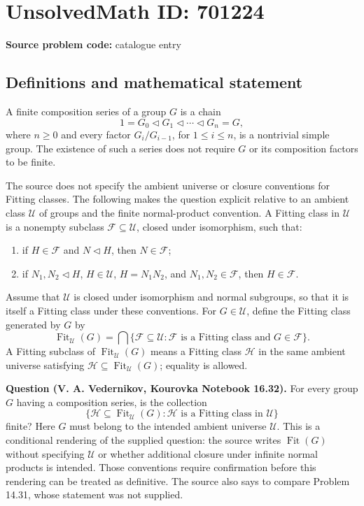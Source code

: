 \documentclass[11pt]{article}
\begin{document}
\section*{UnsolvedMath ID: 701224}
\textbf{Source problem code:} catalogue entry
\subsection{Definitions and mathematical statement}
A finite composition series of a group \(G\) is a chain
\[
1=G_0\triangleleft G_1\triangleleft\cdots\triangleleft G_n=G,
\]
where \(n\geq 0\) and every factor \(G_i/G_{i-1}\), for \(1\leq i\leq n\), is a nontrivial simple group. The existence of such a series does not require \(G\) or its composition factors to be finite.

The source does not specify the ambient universe or closure conventions for Fitting classes. The following makes the question explicit relative to an ambient class \(\mathcal U\) of groups and the finite normal-product convention. A Fitting class in \(\mathcal U\) is a nonempty subclass \(\mathcal F\subseteq\mathcal U\), closed under isomorphism, such that:
\begin{enumerate}
\item if \(H\in\mathcal F\) and \(N\triangleleft H\), then \(N\in\mathcal F\);
\item if \(N_1,N_2\triangleleft H\), \(H\in\mathcal U\), \(H=N_1N_2\), and \(N_1,N_2\in\mathcal F\), then \(H\in\mathcal F\).
\end{enumerate}
Assume that \(\mathcal U\) is closed under isomorphism and normal subgroups, so that it is itself a Fitting class under these conventions. For \(G\in\mathcal U\), define the Fitting class generated by \(G\) by
\[
\operatorname{Fit}_{\mathcal U}(G)
=
\bigcap\{\mathcal F\subseteq\mathcal U:
\mathcal F\text{ is a Fitting class and }G\in\mathcal F\}.
\]
A Fitting subclass of \(\operatorname{Fit}_{\mathcal U}(G)\) means a Fitting class \(\mathcal H\) in the same ambient universe satisfying \(\mathcal H\subseteq\operatorname{Fit}_{\mathcal U}(G)\); equality is allowed.

\textbf{Question (V. A. Vedernikov, Kourovka Notebook 16.32).} For every group \(G\) having a composition series, is the collection
\[
\{\mathcal H\subseteq\operatorname{Fit}_{\mathcal U}(G):
\mathcal H\text{ is a Fitting class in }\mathcal U\}
\]
finite? Here \(G\) must belong to the intended ambient universe \(\mathcal U\). This is a conditional rendering of the supplied question: the source writes \(\operatorname{Fit}(G)\) without specifying \(\mathcal U\) or whether additional closure under infinite normal products is intended. Those conventions require confirmation before this rendering can be treated as definitive. The source also says to compare Problem 14.31, whose statement was not supplied.
\end{document}

